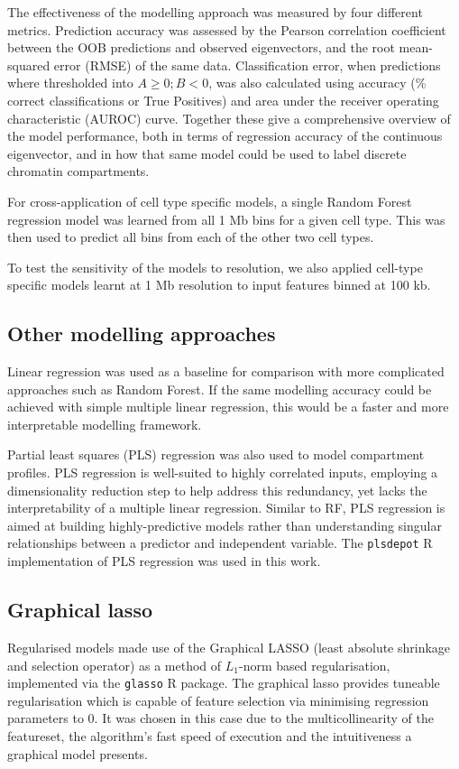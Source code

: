 \documentclass[a4paper,10pt,oneside]{book}
\begin{document}
The effectiveness of the modelling approach was measured by four
different metrics. Prediction accuracy was assessed by the Pearson
correlation coefficient between the OOB predictions and observed eigenvectors, and the root mean-squared
error (RMSE) of the same data. Classification error, when predictions
where thresholded into $A \geq 0; B < 0$, was also calculated using
accuracy (\% correct classifications or True Positives) and area under
the receiver operating characteristic (AUROC) curve. Together these give
a comprehensive overview of the model performance, both in terms of
regression accuracy of the continuous eigenvector, and in how that same
model could be used to label discrete chromatin compartments.

For cross-application of cell type specific models, a single Random
Forest regression model was learned from all 1 Mb bins for a given cell
type. This was then used to predict all bins from each of the other two
cell types.

To test the sensitivity of the models to resolution, we also applied cell-type specific models learnt at 1 Mb resolution to input features binned at 100 kb. 

\subsection{Other modelling approaches}
 
Linear regression was used as a baseline for comparison with more complicated approaches such as Random Forest. If the same modelling accuracy could be achieved with simple multiple linear regression, this would be a faster and more interpretable modelling framework.

Partial least squares (PLS) regression was also used to model compartment profiles. PLS regression is well-suited to highly correlated inputs, employing a dimensionality reduction step to help address this redundancy, yet lacks the interpretability of a multiple linear regression. Similar to RF, PLS regression is aimed at building highly-predictive models rather than understanding singular relationships between a predictor and independent variable.\cite{Tobias1995} The \texttt{plsdepot} R implementation of PLS regression was used in this work.

\subsection{Graphical lasso}
Regularised models made use of the Graphical LASSO\cite{Friedman2008}
(least absolute shrinkage and selection operator) as a method of
$L_1$-norm based
regularisation, implemented via the \texttt{glasso} R package. The
graphical lasso provides tuneable regularisation which is
capable of feature selection via minimising regression parameters to
0. It was chosen in this case due to the multicollinearity of the
featureset, the algorithm's fast speed of
execution and the intuitiveness a graphical model
presents.\cite{Friedman2008} 
\end{document}
